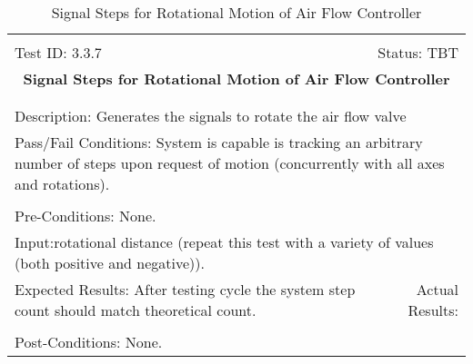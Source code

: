 \documentclass[titlepage]{article}
\begin{document}
\begin{center}%
\begin{table}[h!]
\begin{tabular}{|l r|}\hline&\\[-2mm]
	Test ID: 3.3.7	&Status: TBT\\[-3mm]
	\multicolumn{2}{|c|}{\textbf{\large{Signal Steps for Rotational Motion of Air Flow Controller}}}\\&\\\hline&\\[-3mm]
	\multicolumn{2}{|p{\textwidth}|}{Description: Generates the signals to rotate the air flow valve}\\\hline
	\multicolumn{2}{|p{\textwidth}|}{Pass/Fail Conditions: System is capable is tracking an arbitrary number of steps upon request of motion (concurrently with all axes and rotations).}\\[1mm]\hline&\\[-3mm]
	\multicolumn{2}{|p{\textwidth}|}{Pre-Conditions: None.}\\[4mm]
	\multicolumn{2}{|p{\textwidth}|}{Input:rotational distance (repeat this test with a variety of values (both positive and negative)).}\\[2mm]\hline
	\multicolumn{1}{|p{0.49\textwidth}}{Expected Results: After testing cycle the system step count should match theoretical count.}	&\multicolumn{1}{|p{0.45\textwidth}|}{Actual Results: }\\\hline&\\[-3mm]
	\multicolumn{2}{|p{\textwidth}|}{Post-Conditions: None.}\\\hline
\end{tabular}
\caption{Signal Steps for Rotational Motion of Air Flow Controller}
\end{table}
\end{center}
\newpage
\end{document}
